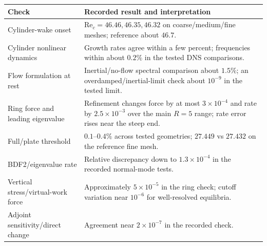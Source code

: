\par\medskip\noindent\begin{minipage}{\linewidth}\centering\small
\begin{tabular}{p{77mm}p{83mm}}
\toprule Check & Recorded result and interpretation\\\midrule
Cylinder-wake onset & $\mathrm{Re}_c=46.46,46.35,46.32$ on coarse/medium/fine meshes; reference about $46.7$.\\
Cylinder nonlinear dynamics & Growth rates agree within a few percent; frequencies within about $0.2\%$ in the tested DNS comparisons.\\
Flow formulation at rest & Inertial/no-flow spectral comparison about $1.5\%$; an overdamped/inertial-limit check about $10^{-9}$ in the tested limit.\\
Ring force and leading eigenvalue & Refinement changes force by at most $3\times10^{-4}$ and rate by $2.5\times10^{-3}$ over the main $R=5$ range; rate error rises near the steep end.\\
Full/plate threshold & $0.1$--$0.4\%$ across tested geometries; $27.449$ vs $27.432$ on the reference fine mesh.\\
BDF2/eigenvalue rate & Relative discrepancy down to $1.3\times10^{-4}$ in the recorded normal-mode tests.\\
Vertical stress/virtual-work force & Approximately $5\times10^{-5}$ in the ring check; cutoff variation near $10^{-6}$ for well-resolved equilibria.\\
Adjoint sensitivity/direct change & Agreement near $2\times10^{-7}$ in the recorded check.\\\bottomrule
\end{tabular}
\end{minipage}\par\medskip

